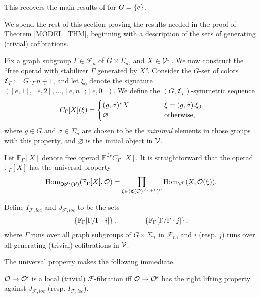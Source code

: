 \documentclass[a4paper,10pt
,draft
]{article}%
\renewcommand{\F}{\mathcal F}
\renewcommand{\1}{\ensuremath{\mathbb{id}}}
\begin{document}
\begin{remark}
      This recovers the main results of \cite{BM13, Cav14} for $G = \left\{e\right\}$. 
\end{remark}



We spend the rest of this section proving the results needed in the proof of Theorem \ref{MODEL_THM},
beginning with a description of the sets of generating (trivial) cofibrations.

Fix a graph subgroup $\Gamma \in \F_n$ of $G \times \Sigma_n$, and $X \in \mathcal V^\Gamma$.
We now construct the ``free operad with stabilizer $\Gamma$ generated by $X$''.
Consider the $G$-set of colors $\mathfrak C_\Gamma := G \cdot_\Gamma \underline{n+1}$,
and let $\xi_0$ denote the signature $([e,1],[e,2],\dots,[e,n];[e,0])$.
We define the $(G,\mathfrak C_\Gamma)$-symmetric sequence
\begin{equation}
      C_\Gamma[X](\xi) =
      \begin{cases}
            (g,\sigma)^{\**} X \qquad \qquad & \xi = (g,\sigma).\xi_0
            \\
            \varnothing & \mbox{otherwise,}
      \end{cases}
\end{equation}
where $g \in G$ and $\sigma \in \Sigma_n$ are chosen to be the \textit{minimal} elements in those groups with this property,
and $\varnothing$ is the initial object in $\mathcal V$.

Let $\mathbb F_\Gamma[X]$ denote free operad $\mathbb F^{\mathfrak C_\Gamma} C_\Gamma[X]$.
It is straightforward that the operad $\mathbb F_\Gamma[X]$ has the universal property
\begin{equation}
      \operatorname{Hom}_{\mathsf{Op}^G(\mathcal V)}(\mathbb F_\Gamma[X], \mathcal{O}) = \mathop\prod\limits_{\xi \in (\mathfrak C(\mathcal{O})^{\times n+1})^\Gamma}\operatorname{Hom}_{\mathcal V^\Gamma}(X, \mathcal{O}(\xi)).
\end{equation}

Define $I_{\F,loc}$ and $J_{\F, loc}$ to be the sets
\begin{align*}
  \left\{\mathbb F_\Gamma[\Gamma/\Gamma \cdot i]\right\}, \qquad \qquad \left\{\mathbb F_\Gamma[\Gamma/\Gamma \cdot j]\right\},
\end{align*}
where $\Gamma$ runs over all graph subgroups of $G \times \Sigma_n$ in $\F_n$,
and $i$ (resp. $j$) runs over all generating (trivial) cofibrations in $\mathcal V$.

The universal property makes the following immediate.
\begin{corollary}
      $\mathcal{O} \to \mathcal{O}'$ is a local (trivial) $\F$-fibration iff
      $\mathcal{O} \to \mathcal{O}'$ has the right lifting property against $J_{\F, loc}$ (resp. $I_{\F, loc}$).
\end{corollary}
\end{document}
